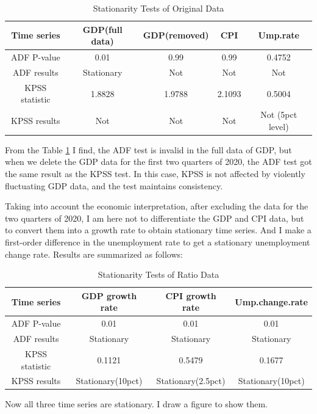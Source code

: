 \documentclass{report}
\begin{document}
\begin{table}[H]
\centering
 \caption{\label{tab:original test} Stationarity Tests of Original Data}
 \begin{tabular}{ccccc}
  \toprule
  Time series & GDP(full data)& GDP(removed) & CPI & Ump.rate \\
  \midrule
ADF P-value & 0.01 & 0.99 & 0.99 &0.4752 \\
ADF results & Stationary & Not& Not &Not\\
KPSS statistic & 1.8828&1.9788 &2.1093&0.5004 \\
KPSS results & Not & Not & Not & Not (5pct level)\\
  \bottomrule
 \end{tabular}
\end{table}

From the Table \ref{tab:original test} I find, the ADF test is invalid in the full data of GDP, but when we delete the GDP data for the first two quarters of 2020, the ADF test got the same result as the KPSS test. In this case, KPSS is not affected by violently fluctuating GDP data, and the test maintains consistency. 


Taking into account the economic interpretation, after excluding the data for the two quarters of 2020, I am here not to differentiate the GDP and CPI data, but to convert them into a growth rate to obtain stationary time series. And I make a first-order difference in the unemployment rate to get a stationary unemployment change rate. Results are summarized as follows:


\begin{table}[H]
\centering
 \caption{\label{tab:ratio test} Stationarity Tests of Ratio Data}
 \begin{tabular}{cccc}
  \toprule
  Time series & GDP growth rate & CPI growth rate& Ump.change.rate \\
  \midrule
ADF P-value & 0.01 & 0.01  & 0.01  \\
ADF results & Stationary & Stationary& Stationary\\
KPSS statistic & 0.1121&0.5479 &0.1677 \\
KPSS results & Stationary(10pct) & Stationary(2.5pct) & Stationary(10pct) \\
  \bottomrule
 \end{tabular}
\end{table}

Now all three time series are stationary. I draw a figure to show them.
\end{document}
